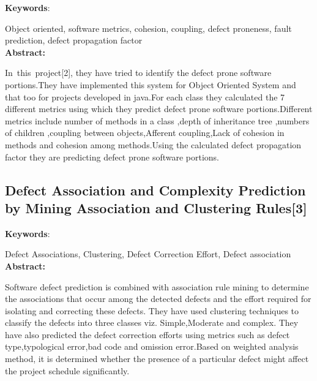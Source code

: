 \documentclass[oneside,a4paper,12pt]{book}
\begin{document}
\setlength{\parskip}{0.0pt}
\textbf{Keywords}: \par

Object oriented, software metrics, cohesion, coupling, defect proneness, fault prediction, defect propagation factor\\
\setlength{\parskip}{0.0pt}
\textbf{Abstract:}\par

\begin{justify}
\textbf{ }
In\ this\ project[2],  they have tried to identify the defect prone software portions.They have implemented this system for Object Oriented System and that too for projects developed in java.For each class they calculated the 7 different metrics using which they predict defect prone software portions.Different metrics include  number of methods in a class ,depth of inheritance tree ,numbers of children ,coupling between objects,Afferent coupling,Lack of cohesion in methods and cohesion among methods.Using the calculated defect propagation factor they are predicting defect prone software portions.\par 
\end{justify}\par
\newpage

\subsection{Defect Association and Complexity Prediction by Mining Association and Clustering Rules[3]}

\setlength{\parskip}{0.0pt}
\textbf{Keywords}: \par

Defect Associations, Clustering, Defect Correction Effort, Defect association\\
\setlength{\parskip}{0.0pt}
\textbf{Abstract:}\par

\begin{justify}
\textbf{ }
Software defect prediction is combined with association rule mining to determine the associations that occur among the detected defects and the effort required for isolating and correcting these defects. They have used clustering techniques to classify the defects into three classes viz. Simple,Moderate and complex. They have also predicted the defect correction efforts using metrics such as defect type,typological error,bad code and omission error.Based on weighted analysis method, it is determined whether the presence of a particular defect might affect the project schedule significantly.\par
\end{justify}\par
\end{document}
